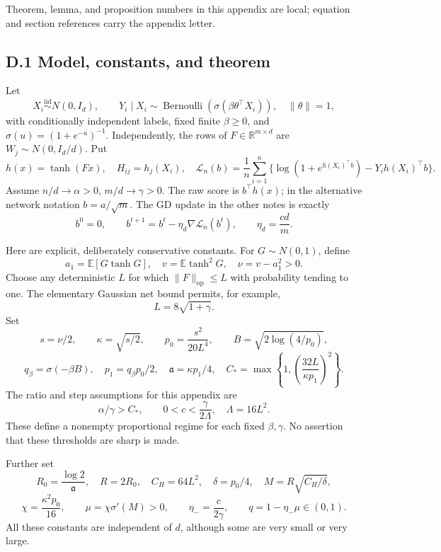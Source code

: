 \documentclass[
  11pt,
  a4paper,
]{article}
\begin{document}
Theorem, lemma, and proposition numbers in this appendix are local;
equation and section references carry the appendix letter.

\hypertarget{d.1-model-constants-and-theorem}{%
\subsection{D.1 Model, constants, and
theorem}\label{d.1-model-constants-and-theorem}}

Let \[
X_i\stackrel{\mathrm{iid}}\sim N(0,I_d),\qquad
Y_i\mid X_i\sim\operatorname{Bernoulli}(\sigma(\beta\theta^\top X_i)),
\quad \|\theta\|=1,
\] with conditionally independent labels, fixed finite \(\beta\geq0\),
and \(\sigma(u)=(1+e^{-u})^{-1}\). Independently, the rows of
\(F\in\mathbb R^{m\times d}\) are \(W_j\sim N(0,I_d/d)\). Put \[
h(x)=\tanh(Fx),\quad H_{ij}=h_j(X_i),\quad
\mathcal L_n(b)=\frac1n\sum_{i=1}^n
 \big\{\log(1+e^{h(X_i)^\top b})-Y_i h(X_i)^\top b\big\}.
\tag{D.1.1}
\] Assume \(n/d\to\alpha>0\), \(m/d\to\gamma>0\). The raw score is
\(b^\top h(x)\); in the alternative network notation \(b=a/\sqrt m\).
The GD update in the other notes is exactly \[
b^0=0,\qquad b^{t+1}=b^t-\eta_d\nabla\mathcal L_n(b^t),
\qquad \eta_d=\frac{cd}{m}.
\tag{D.1.2}
\]

Here are explicit, deliberately conservative constants. For
\(G\sim N(0,1)\), define \[
a_1=\mathbb E[G\tanh G],\quad v=\mathbb E\tanh^2G,
\quad \nu=v-a_1^2>0.
\] Choose any deterministic \(L\) for which
\(\|F\|_{\mathrm{op}}\leq L\) with probability tending to one. The
elementary Gaussian net bound permits, for example, \[
L=8\sqrt{1+\gamma}.
\] Set \[
s=\nu/2,\qquad \kappa=\sqrt{s/2},\qquad
p_0=\frac{s^2}{20L^4},\qquad
B=\sqrt{2\log(4/p_0)},
\] \[
q_\beta=\sigma(-\beta B),\quad
p_1=q_\beta p_0/2,\quad
\mathfrak a=\kappa p_1/4,\quad
C_*=\max\left\{1,\left(\frac{32L}{\kappa p_1}\right)^2\right\}.
\tag{D.1.3}
\] The ratio and step assumptions for this appendix are \[
\boxed{\quad\alpha/\gamma>C_*,\qquad
0<c<\frac{\gamma}{2\Lambda},\quad
\Lambda=16L^2.\quad}
\tag{D.1.4}
\] These define a nonempty proportional regime for each fixed
\(\beta,\gamma\). No assertion that these thresholds are sharp is made.

Further set \[
R_0=\frac{\log2}{\mathfrak a},\quad R=2R_0,
\quad C_H=64L^2,\quad \delta=p_0/4,
\quad M=R\sqrt{C_H/\delta},
\] \[
\chi=\frac{\kappa^2p_0}{16},\qquad
\mu=\chi\sigma'(M)>0,\qquad
\eta_-=\frac{c}{2\gamma},\qquad q=1-\eta_-\mu\in(0,1).
\tag{D.1.5}
\] All these constants are independent of \(d\), although some are very
small or very large.
\end{document}
